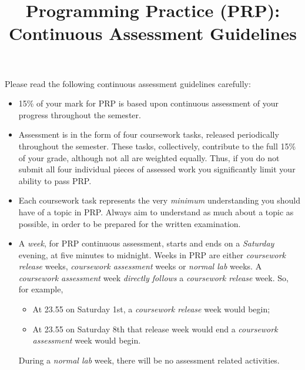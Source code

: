 \documentclass[11pt]{article}
\title{Programming Practice (PRP): \\ Continuous Assessment Guidelines}
\date{}                                           %
\begin{document}
\maketitle

Please read the following continuous assessment guidelines carefully:

\begin{itemize}

\item 15\% of your mark for PRP is based upon continuous assessment of your progress throughout the semester.

\item Assessment is in the form of four coursework tasks, released periodically throughout the semester. These tasks, collectively, contribute to the full 15\% of your grade, although not all are weighted equally. Thus, if you do not submit all four individual pieces of assessed work you significantly limit your ability to pass PRP.

\item Each coursework task represents the very \emph{minimum} understanding you should have of a topic in PRP. Always aim to understand as much about a topic as possible, in order to be prepared for the written examination.

\item A \emph{week}, for PRP continuous assessment, starts and ends on a \emph{Saturday} evening, at five minutes to midnight. Weeks in PRP are either \emph{coursework release} weeks, \emph{coursework assessment} weeks or \emph{normal lab} weeks. A \emph{coursework assessment} week \emph{directly follows} a \emph{coursework release} week. So, for example, 

	\begin{itemize}
		\item At 23.55 on Saturday 1st, a \emph{coursework release} week would begin; 
		\item At 23.55 on Saturday 8th that release week would end a \emph{coursework assessment} week would begin. 
	\end{itemize}

During a \emph{normal lab} week, there will be no assessment related activities. 


\end{itemize}
\end{document}
